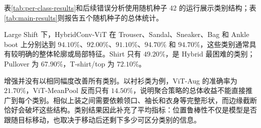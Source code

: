 

表\ref{tab:per-class-results}和后续错误分析使用随机种子 42 的运行展示类别结构；表\ref{tab:main-results}则报告五个随机种子的总体统计。

Large Shift 下，HybridConv-ViT 在 Trouser、Sandal、Sneaker、Bag 和 Ankle boot 上分别达到 $94.10\%$、$92.00\%$、$91.10\%$、$94.70\%$ 和 $94.70\%$，这些类别通常具有较明确的整体轮廓或局部特征。Shirt 只有 $49.20\%$，是 Hybrid 最困难的类别；Pullover 为 $67.90\%$，T-shirt/top 为 $72.10\%$。

增强并没有以相同幅度改善所有类别。以衬衫类为例，ViT-Aug 的准确率为 $21.70\%$，ViT-MeanPool 反而只有 $14.50\%$，说明聚合策略的总体收益不能直接推广到每个类别。相似上装之间需要依赖领口、袖长和衣身等完整形状，而边缘截断恰好会破坏这些结构。类别结果因此补充了平均指标：位置鲁棒性不仅是模型是否跟随目标移动，也取决于移动后还剩下多少可区分类别的信息。
